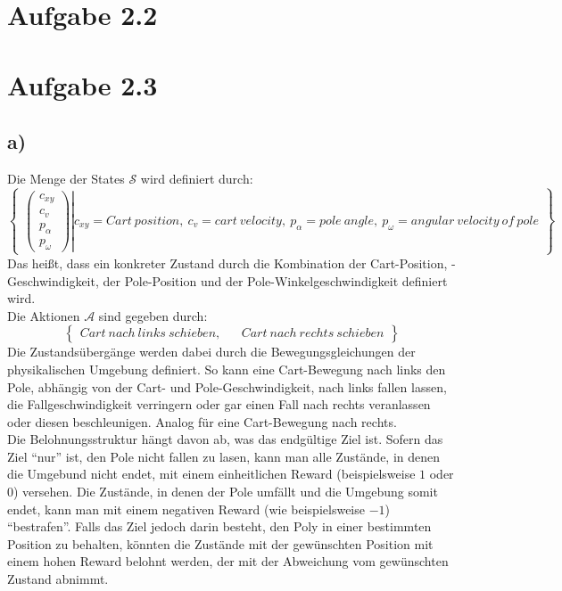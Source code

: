 \documentclass[11pt]{article}
\begin{document}
\section*{Aufgabe 2.2}

\section*{Aufgabe 2.3}

\subsection*{a)}

Die Menge der States $\mathcal{S}$ wird definiert durch:
\[ %
\begin{Bmatrix}
    \left.
    \begin{pmatrix}
        c_{xy}\\
        c_v\\
        p_\alpha\\
        p_\omega
    \end{pmatrix}
    \right\vert
    c_{xy} = Cart~position,~c_v = cart~velocity,~p_\alpha = pole~angle,~p_\omega = angular~velocity~of~pole
\end{Bmatrix}
\]%
Das heißt, dass ein konkreter Zustand durch die Kombination der Cart-Position, -Geschwindigkeit, der Pole-Position und der Pole-Winkelgeschwindigkeit definiert wird.\\
Die Aktionen $\mathcal{A}$ sind gegeben durch:
\[ %
\begin{Bmatrix}
    Cart~nach~links~schieben, && Cart~nach~rechts~schieben
\end{Bmatrix}
\]%
Die Zustandsübergänge werden dabei durch die Bewegungsgleichungen der physikalischen Umgebung definiert. So kann eine Cart-Bewegung nach links den Pole, abhängig von der Cart- und Pole-Geschwindigkeit, nach links fallen lassen, die Fallgeschwindigkeit verringern oder gar einen Fall nach rechts veranlassen oder diesen beschleunigen. Analog für eine Cart-Bewegung nach rechts.\\
Die Belohnungsstruktur hängt davon ab, was das endgültige Ziel ist. Sofern das Ziel ``nur'' ist, den Pole nicht fallen zu lasen, kann man alle Zustände, in denen die Umgebund nicht endet, mit einem einheitlichen Reward (beispielsweise $1$ oder $0$) versehen. Die Zustände, in denen der Pole umfällt und die Umgebung somit endet, kann man mit einem negativen Reward (wie beispielsweise $-1$) ``bestrafen''. Falls das Ziel jedoch darin besteht, den Poly in einer bestimmten Position zu behalten, könnten die Zustände mit der gewünschten Position mit einem hohen Reward belohnt werden, der mit der Abweichung vom gewünschten Zustand abnimmt.\\
\end{document}
